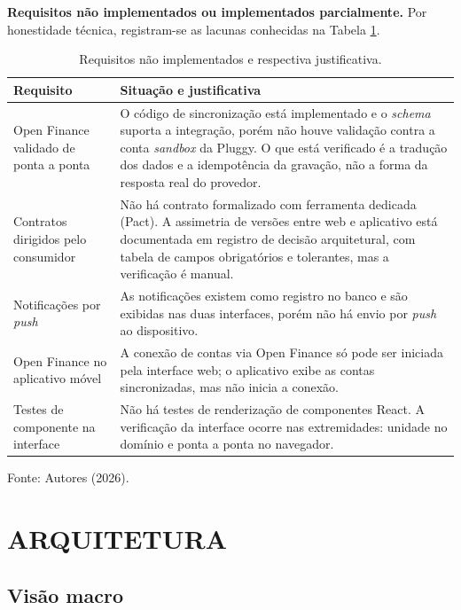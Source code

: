 \documentclass[12pt,a4paper]{article}
\begin{document}
\textbf{Requisitos não implementados ou implementados parcialmente.} Por honestidade técnica, registram-se as lacunas conhecidas na Tabela \ref{tab:lacunas}.

\begin{table}[H]
\centering
\caption{Requisitos não implementados e respectiva justificativa.}
\label{tab:lacunas}
\renewcommand{\arraystretch}{1.4}
\begin{tabularx}{\textwidth}{@{}>{\RaggedRight}p{4cm}>{\RaggedRight\arraybackslash}X@{}}
\toprule
\textbf{Requisito} & \textbf{Situação e justificativa} \\
\midrule
Open Finance validado de ponta a ponta & O código de sincronização está implementado e o \textit{schema} suporta a integração, porém não houve validação contra a conta \textit{sandbox} da Pluggy. O que está verificado é a tradução dos dados e a idempotência da gravação, não a forma da resposta real do provedor. \\
Contratos dirigidos pelo consumidor & Não há contrato formalizado com ferramenta dedicada (Pact). A assimetria de versões entre web e aplicativo está documentada em registro de decisão arquitetural, com tabela de campos obrigatórios e tolerantes, mas a verificação é manual. \\
Notificações por \textit{push} & As notificações existem como registro no banco e são exibidas nas duas interfaces, porém não há envio por \textit{push} ao dispositivo. \\
Open Finance no aplicativo móvel & A conexão de contas via Open Finance só pode ser iniciada pela interface web; o aplicativo exibe as contas sincronizadas, mas não inicia a conexão. \\
Testes de componente na interface & Não há testes de renderização de componentes React. A verificação da interface ocorre nas extremidades: unidade no domínio e ponta a ponta no navegador. \\
\bottomrule
\end{tabularx}
\vspace{0.3cm}

\noindent\footnotesize Fonte: Autores (2026).
\end{table}

\section{ARQUITETURA}

\subsection{Visão macro}
\end{document}
